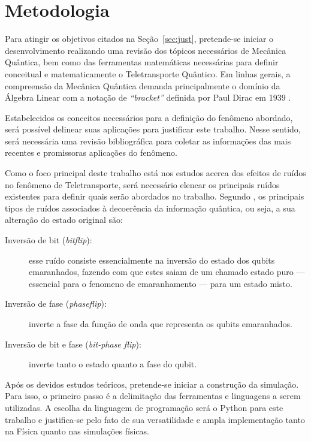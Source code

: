 \documentclass[12pt,oneside,brazil,hidelinks,article,sumario=tradicional,a4paper]{abntex2}
\begin{document}
\section{Metodologia}

Para atingir os objetivos citados na Seção~\ref{sec:just}, pretende-se iniciar o desenvolvimento realizando uma revisão dos tópicos necessários de Mecânica Quântica, bem como das ferramentas matemáticas necessárias para definir conceitual e matematicamente o Teletransporte Quântico. Em linhas gerais, a compreensão da Mecânica Quântica demanda principalmente o domínio da Álgebra Linear com a notação de \textit{``bracket''} definida por Paul Dirac em 1939 \cite{DIRAC}.

Estabelecidos os conceitos necessários para a definição do fenômeno abordado, será possível delinear suas aplicações para justificar este trabalho. Nesse sentido, será necessária uma revisão bibliográfica para coletar as informações das mais recentes e promissoras aplicações do fenômeno.

Como o foco principal deste trabalho está nos estudos acerca dos efeitos de ruídos no fenômeno de Teletransporte, será necessário elencar os principais ruídos existentes para definir quais serão abordados no trabalho. Segundo \textcite{teseufscar}, os principais tipos de ruídos associados à decoerência da informação quântica, ou seja, a sua alteração do estado original são:

\begin{description}
  \item [Inversão de bit (\textit{bitflip}):] esse ruído consiste essencialmente na inversão do estado dos qubits emaranhados, fazendo com que estes saiam de um chamado estado puro --- essencial para o fenomeno de emaranhamento --- para um estado misto.
  \item [Inversão de fase (\textit{phaseflip}):] inverte a fase da função de onda que representa os qubits emaranhados.
  \item [Inversão de bit e fase (\textit{bit-phase flip}):] inverte tanto o estado quanto a fase do qubit.
\end{description}

Após os devidos estudos teóricos, pretende-se iniciar a construção da simulação. Para isso, o primeiro passo é a delimitação das ferramentas e linguagens a serem utilizadas. A escolha da linguagem de programação será o Python para este trabalho e justifica-se pelo fato de sua versatilidade e ampla implementação tanto na Física quanto nas simulações físicas.
\end{document}
